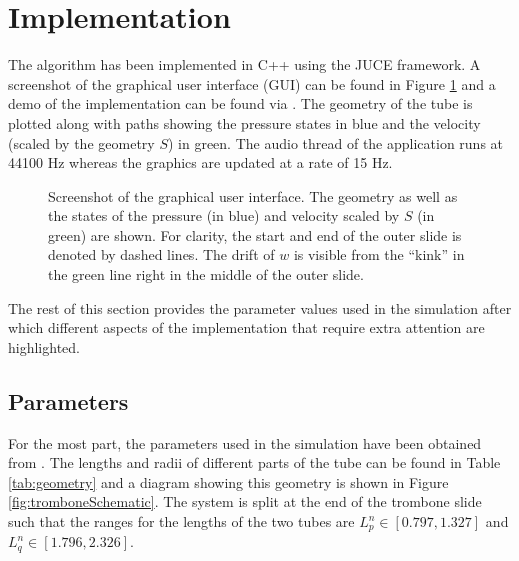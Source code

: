 \section{Implementation}\label{sec:implementation}
The algorithm has been implemented in C++ using the JUCE framework. A screenshot of the graphical user interface (GUI) can be found in Figure \ref{fig:GUI} and a demo of the implementation can be found via \cite{DEMO} . The geometry of the tube is plotted along with paths showing the pressure states in blue and the velocity (scaled by the geometry $S$) in green. The audio thread of the application runs at 44100 Hz whereas the graphics are updated at a rate of 15 Hz.

\begin{figure}[t]
    \centering
    \caption{Screenshot of the graphical user interface. The geometry as well as the states of the pressure (in blue) and velocity scaled by $S$ (in green) are shown. For clarity, the start and end of the outer slide is denoted by dashed lines. The drift of $w$ is visible from the ``kink'' in the green line right in the middle of the outer slide.}
    \label{fig:GUI}
\end{figure}

The rest of this section provides the parameter values used in the simulation after which different aspects of the implementation that require extra attention are highlighted.

\subsection{Parameters}
For the most part, the parameters used in the simulation have been obtained from \cite{Harrison2018, Smyth2011, Benade1968}. The lengths and radii of different parts of the tube can be found in Table \ref{tab:geometry} and a diagram showing this geometry is shown in Figure \ref{fig:tromboneSchematic}.
The system is split at the end of the trombone slide such that the ranges for the lengths of the two tubes are $L_p^n \in[0.797, 1.327]$ and $L_q^n \in [1.796, 2.326]$.

